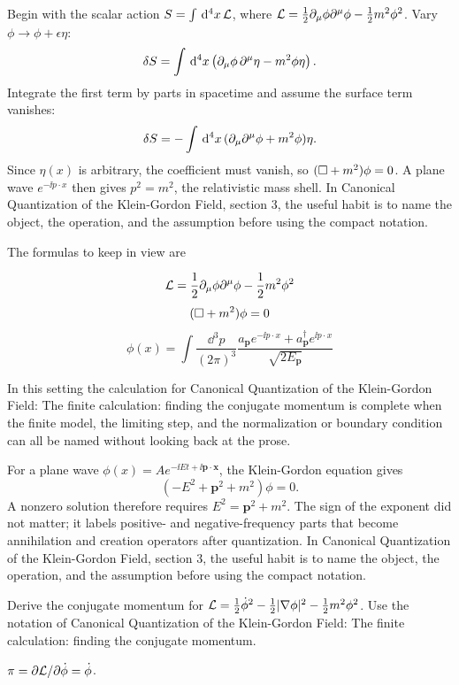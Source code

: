 Begin with the scalar action \(S=\int\,\mathrm d^4x\,\mathcal L\), where \(\mathcal L=\frac12\partial_\mu\phi\partial^\mu\phi-\frac12m^2\phi^2\).  Vary \(\phi\to\phi+\epsilon\eta\):
\[
  \delta S=\int\,\mathrm d^4x\left(\partial_\mu\phi\,\partial^\mu\eta-m^2\phi\eta\right).
\]
Integrate the first term by parts in spacetime and assume the surface term vanishes:
\[
  \delta S=-\int\,\mathrm d^4x\,(\partial_\mu\partial^\mu\phi+m^2\phi)\eta.
\]
Since \(\eta(x)\) is arbitrary, the coefficient must vanish, so \((\Box+m^2)\phi=0\).  A plane wave \(e^{-\ii p\cdot x}\) then gives \(p^2=m^2\), the relativistic mass shell.  In Canonical Quantization of the Klein-Gordon Field, section 3, the useful habit is to name the object, the operation, and the assumption before using the compact notation.

The formulas to keep in view are

\[
  \mathcal L=\frac12\partial_\mu\phi\partial^\mu\phi-\frac12m^2\phi^2
\]
\[
  (\Box+m^2)\phi=0
\]
\[
  \phi(x)=\int\frac{\dd^3p}{(2\pi)^3}\frac{a_{\bm p}e^{-\ii p\cdot x}+a_{\bm p}^\dagger e^{\ii p\cdot x}}{\sqrt{2E_{\bm p}}}
\]

In this setting the calculation for Canonical Quantization of the Klein-Gordon Field: The finite calculation: finding the conjugate momentum is complete when the finite model, the limiting step, and the normalization or boundary condition can all be named without looking back at the prose.




\begin{example}
For a plane wave \(\phi(x)=Ae^{-\ii Et+\ii\bm p\cdot\bm x}\), the Klein-Gordon equation gives
\[
  (-E^2+\bm p^2+m^2)\phi=0.
\]
A nonzero solution therefore requires \(E^2=\bm p^2+m^2\).  The sign of the exponent did not matter; it labels positive- and negative-frequency parts that become annihilation and creation operators after quantization.  In Canonical Quantization of the Klein-Gordon Field, section 3, the useful habit is to name the object, the operation, and the assumption before using the compact notation.
\end{example}



\begin{exercise}
Derive the conjugate momentum for \(\mathcal L=\frac12\dot\phi^2-\frac12|\nabla\phi|^2-\frac12m^2\phi^2\).  Use the notation of Canonical Quantization of the Klein-Gordon Field: The finite calculation: finding the conjugate momentum.
\begin{answer}
\(\pi=\partial\mathcal L/\partial\dot\phi=\dot\phi\).
\end{answer}
\end{exercise}

